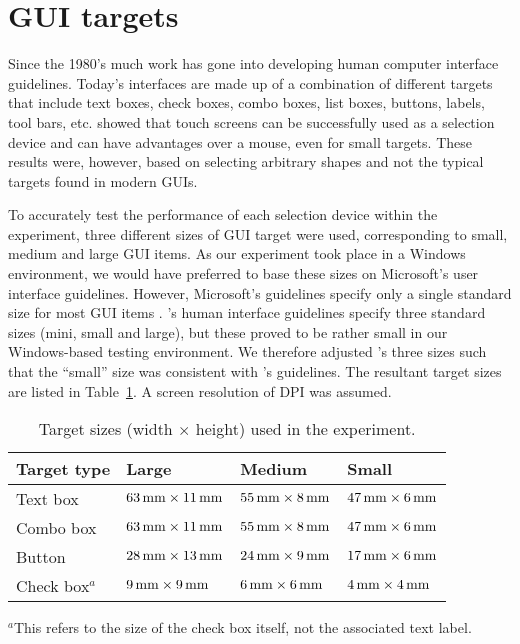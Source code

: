 \documentclass{elsart}
\begin{document}
\section{GUI targets}
\label{sec-GUI}

Since the 1980's much work has gone into developing human computer
interface guidelines. Today's interfaces are made up of a combination of
different targets that include text boxes, check boxes, combo boxes,
list boxes, buttons, labels, tool bars, etc. \citet{Sear-A-1991-IJMMS}
showed that touch screens can be successfully used as a selection device
and can have advantages over a mouse, even for small targets. These
results were, however, based on selecting arbitrary shapes and not the
typical targets found in modern GUIs.

To accurately test the performance of each selection device within the
experiment, three different sizes of GUI target were used, corresponding
to small, medium and large GUI items. As our experiment took place in a
Windows environment, we would have preferred to base these sizes on
Microsoft's user interface guidelines. However, Microsoft's guidelines
specify only a single standard size for most GUI items \citep[pp.\
448--450]{MS-1999-UI}. \citeauthor{Appl-2004-HIG}'s
\citeyearpar{Appl-2004-HIG} human interface guidelines specify three
standard sizes (mini, small and large), but these proved to be rather
small in our Windows-based testing environment. We therefore adjusted
\citeauthor{Appl-2004-HIG}'s three sizes such that the ``small'' size
was consistent with \citeauthor{MS-1999-UI}'s guidelines. The resultant
target sizes are listed in Table~\ref{tab-target-sizes}. A screen
resolution of \unit[81]{DPI} was assumed.


\begin{table}
	\caption{Target sizes (width \(\times\) height) used in the experiment.}
	\label{tab-target-sizes}
	\begin{tabular}{llll}
		\hline
		\textbf{Target type}	&	\textbf{Large}							&	\textbf{Medium}							&	\textbf{Small}	\\
		\hline
		Text box				&	\(\unit[63]{mm} \times \unit[11]{mm}\)	&	\(\unit[55]{mm} \times \unit[8]{mm}\)	&	\(\unit[47]{mm} \times \unit[6]{mm}\)	\\
		Combo box				&	\(\unit[63]{mm} \times \unit[11]{mm}\)	&	\(\unit[55]{mm} \times \unit[8]{mm}\)	&	\(\unit[47]{mm} \times \unit[6]{mm}\)	\\
		Button					&	\(\unit[28]{mm} \times \unit[13]{mm}\)	&	\(\unit[24]{mm} \times \unit[9]{mm}\)	&	\(\unit[17]{mm} \times \unit[6]{mm}\)	\\
		Check box\(^{a}\)		&	\(\unit[9]{mm} \times \unit[9]{mm}\)	&	\(\unit[6]{mm} \times \unit[6]{mm}\)	&	\(\unit[4]{mm} \times \unit[4]{mm}\)	\\
		\hline
	\end{tabular}
	
	{\footnotesize \(^{a}\)This refers to the size of the check box itself, not the associated text label.}
\end{table}
\end{document}
